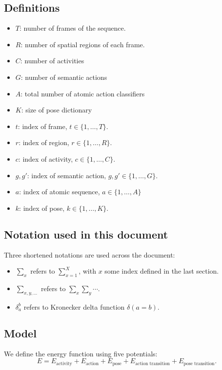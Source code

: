 \documentclass[10pt,letterpaper]{article}
\newcommand{\+}[1]{\ensuremath{{\boldsymbol #1}}}
\begin{document}
\subsection*{Definitions}
\begin{itemize}
\item $T$: number of frames of the sequence.
\item $R$: number of spatial regions of each frame.
\item $C$: number of activities
\item $G$: number of semantic actions
\item $A$: total number of atomic action classifiers
\item $K$: size of pose dictionary
\item $t$: index of frame, $t \in \{1,\dots,T\}$.
\item $r$: index of region, $r \in \{1,\dots,R\}$.
\item $c$: index of activity, $c \in \{1,\dots,C\}$.
\item $g,g'$: index of semantic action, $g,g' \in \{1,\dots,G\}$.
\item $a$: index of atomic sequence, $a \in \{1,\dots,A\}$
\item $k$: index of pose, $k \in \{1,\dots,K\}$.
\end{itemize}

\subsection*{Notation used in this document}
Three shortened notations are used across the document:
\begin{itemize}
\item $\sum_x$ refers to $\sum_{x=1}^X$, with $x$ some index defined in the last section.
\item $\sum_{x,y,...}$ refers to $\sum_x \sum_y \cdots$.
\item $\delta_a^b$ refers to Kronecker delta function $\delta(a = b)$.
\end{itemize}


\subsection{Model}

We define the energy function using five potentials:
\begin{equation}
E = E_{\text{activity}} + E_{\text{action}} + E_{\text{pose}}
  + E_{\text{action transition}} + E_{\text{pose transition}}.
\end{equation}
\end{document}
